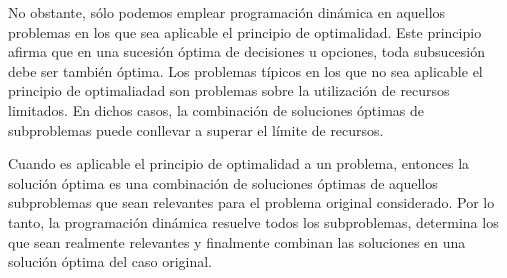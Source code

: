 No obstante, sólo podemos emplear programación dinámica en aquellos problemas en los que sea aplicable el principio de optimalidad. Este principio afirma que en una sucesión óptima de decisiones u opciones, toda subsucesión debe ser también óptima. Los problemas típicos en los que no sea aplicable el principio de optimaliadad son problemas sobre la utilización de recursos limitados. En dichos casos, la combinación de soluciones óptimas de subproblemas puede conllevar a superar el límite de recursos.

Cuando es aplicable el principio de optimalidad a un problema, entonces la solución óptima es una combinación de soluciones óptimas de aquellos subproblemas que sean relevantes para el problema original considerado. Por lo tanto, la programación dinámica resuelve todos los subproblemas, determina los que sean realmente relevantes y finalmente combinan las soluciones en una solución óptima del caso original.